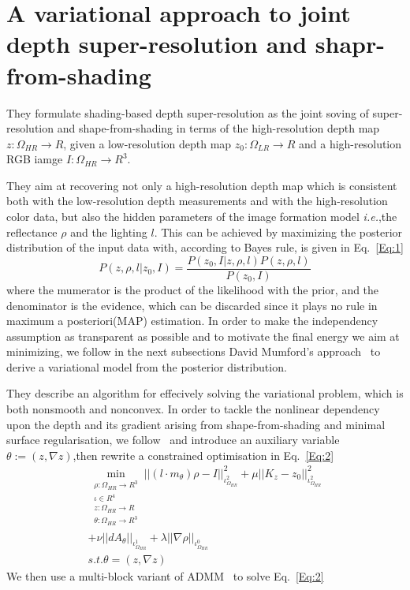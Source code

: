 \documentclass[10pt,twocolumn,letterpaper]{article}
\begin{document}
\section{A variational approach to joint depth super-resolution and shapr-from-shading}
They formulate shading-based depth super-resolution as the joint soving of super-resolution and shape-from-shading in terms of the high-resolution depth map $z:\Omega_{HR}\rightarrow R$, given a low-resolution depth map $z_0: \Omega_{LR}\rightarrow R$ and a high-resolution RGB iamge $I:\Omega_{HR}\rightarrow R^3$.\par
They aim at recovering not only a high-resolution depth map which is consistent both with the low-resolution depth measurements and with the high-resolution color data, but also the hidden parameters of the image formation model \emph{i.e.},the reflectance $\rho$ and the lighting $l$. This can be achieved by maximizing the posterior distribution of the input data with, according to Bayes rule, is given in Eq.~\ref{Eq:1}
\begin{equation}
P(z,\rho,l|z_0,I)=\frac{P(z_0,I|z,\rho,l)P(z,\rho,l)}{P(z_0,I)}
\label{Eq:1}
\end{equation}
where the mumerator is the product of the likelihood with the prior, and the denominator is the evidence, which can be discarded since it plays no rule in maximum a posteriori(MAP) estimation. In order to make the independency assumption as transparent as possible and to motivate the final energy we aim at minimizing, we follow in the next subsections David Mumford's approach~\cite{Or2015RGBD} to derive a variational model from the posterior distribution.\par
They describe an algorithm for effecively solving the variational problem, which is both nonsmooth and nonconvex. In order to tackle the nonlinear dependency upon the depth and its gradient arising from shape-from-shading and minimal surface regularisation, we follow~\cite{Yvain2017AV} and introduce an auxiliary variable $\theta:=(z,\nabla z)$,then rewrite a constrained optimisation in Eq.~\ref{Eq:2}
\begin{multline}
\min_{\substack{\rho:\Omega_{HR}\rightarrow R^3 \\ \iota \in R^4 \\ z:\Omega_{HR}\rightarrow R \\ \theta:\Omega_{HR}\rightarrow R^3}}||(l\cdot m_\theta)\rho-I||_{\iota^2_{\Omega_{HR}}}^2+\mu||K_z-z_0||_{\iota^2_{\Omega_{HR}}}^2 \\
+\nu||dA_\theta||_{\iota^1_{\Omega_{HR}}}+\lambda||\nabla\rho||_{\iota^0_{\Omega_{HR}}} \\
s.t.\theta=(z,\nabla z)
\label{Eq:2}
\end{multline}
We then use a multi-block variant of ADMM~\cite{Boyd2011Distributed,Eckstein1992On}
to solve Eq.~\ref{Eq:2}
\end{document}
